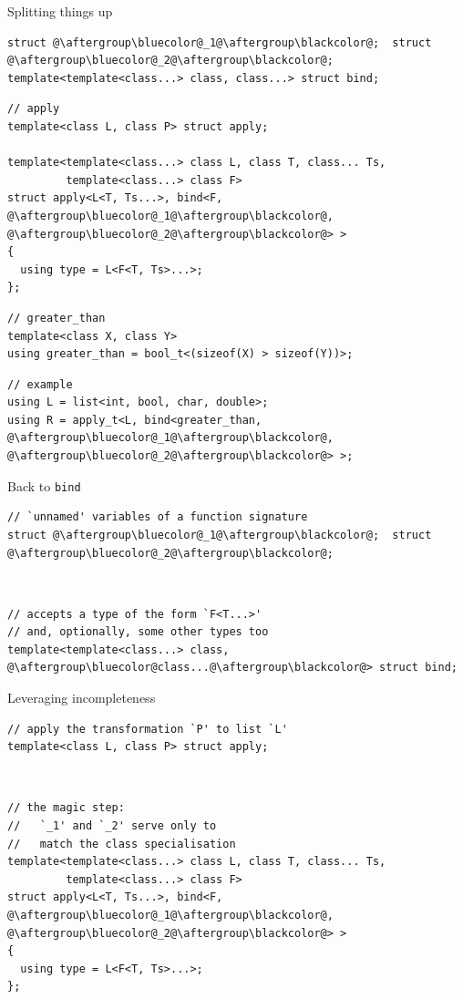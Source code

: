 \documentclass[xcolor=dvipsnames]{beamer}
\begin{document}
\begin{frame}[fragile]{Splitting things up}
\begin{lstlisting}
struct @\aftergroup\bluecolor@_1@\aftergroup\blackcolor@;  struct @\aftergroup\bluecolor@_2@\aftergroup\blackcolor@;
template<template<class...> class, class...> struct bind;
\end{lstlisting}

\begin{lstlisting}
// apply
template<class L, class P> struct apply;

template<template<class...> class L, class T, class... Ts,
         template<class...> class F>
struct apply<L<T, Ts...>, bind<F, @\aftergroup\bluecolor@_1@\aftergroup\blackcolor@, @\aftergroup\bluecolor@_2@\aftergroup\blackcolor@> >
{
  using type = L<F<T, Ts>...>;
};
\end{lstlisting}
\begin{lstlisting}
// greater_than
template<class X, class Y>
using greater_than = bool_t<(sizeof(X) > sizeof(Y))>;
\end{lstlisting}

\begin{lstlisting}
// example
using L = list<int, bool, char, double>;
using R = apply_t<L, bind<greater_than, @\aftergroup\bluecolor@_1@\aftergroup\blackcolor@, @\aftergroup\bluecolor@_2@\aftergroup\blackcolor@> >;
\end{lstlisting}
\end{frame}


\begin{frame}[fragile]{Back to \texttt{bind}}
\begin{lstlisting}
// `unnamed' variables of a function signature
struct @\aftergroup\bluecolor@_1@\aftergroup\blackcolor@;  struct @\aftergroup\bluecolor@_2@\aftergroup\blackcolor@;
\end{lstlisting}

~

\begin{lstlisting}
// accepts a type of the form `F<T...>'
// and, optionally, some other types too
template<template<class...> class, @\aftergroup\bluecolor@class...@\aftergroup\blackcolor@> struct bind;
\end{lstlisting}
\end{frame}


\begin{frame}[fragile]{Leveraging incompleteness}
\begin{lstlisting}
// apply the transformation `P' to list `L'
template<class L, class P> struct apply;
\end{lstlisting}

~

\begin{lstlisting}
// the magic step:
//   `_1' and `_2' serve only to
//   match the class specialisation
template<template<class...> class L, class T, class... Ts,
         template<class...> class F>
struct apply<L<T, Ts...>, bind<F, @\aftergroup\bluecolor@_1@\aftergroup\blackcolor@, @\aftergroup\bluecolor@_2@\aftergroup\blackcolor@> >
{
  using type = L<F<T, Ts>...>;
};
\end{lstlisting}
\end{frame}
\end{document}
